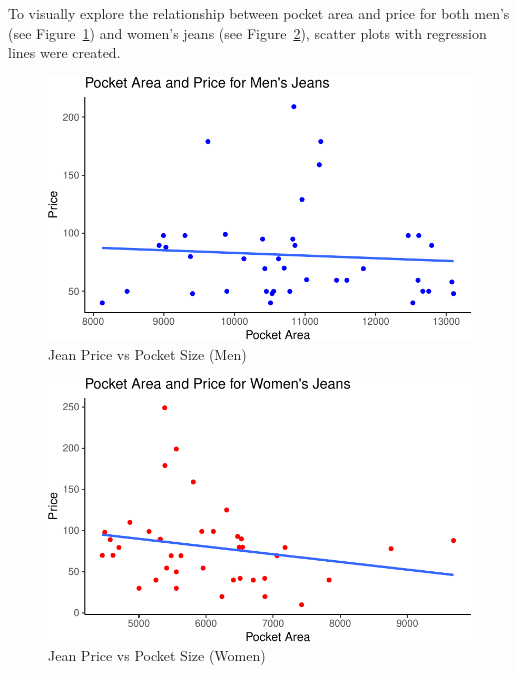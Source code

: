 \documentclass[
  letterpaper,
  DIV=11,
  numbers=noendperiod]{scrartcl}
\begin{document}
To visually explore the relationship between pocket area and price for
both men's (see Figure~\ref{fig-price_per_pocket_men}) and women's jeans
(see Figure~\ref{fig-price_per_pocket_women}), scatter plots with
regression lines were created.

\begin{figure}

{\centering \includegraphics{paper_files/figure-pdf/fig-price_per_pocket_men-1.pdf}

}

\caption{\label{fig-price_per_pocket_men}Jean Price vs Pocket Size
(Men)}

\end{figure}

\begin{figure}

{\centering \includegraphics{paper_files/figure-pdf/fig-price_per_pocket_women-1.pdf}

}

\caption{\label{fig-price_per_pocket_women}Jean Price vs Pocket Size
(Women)}

\end{figure}
\end{document}
